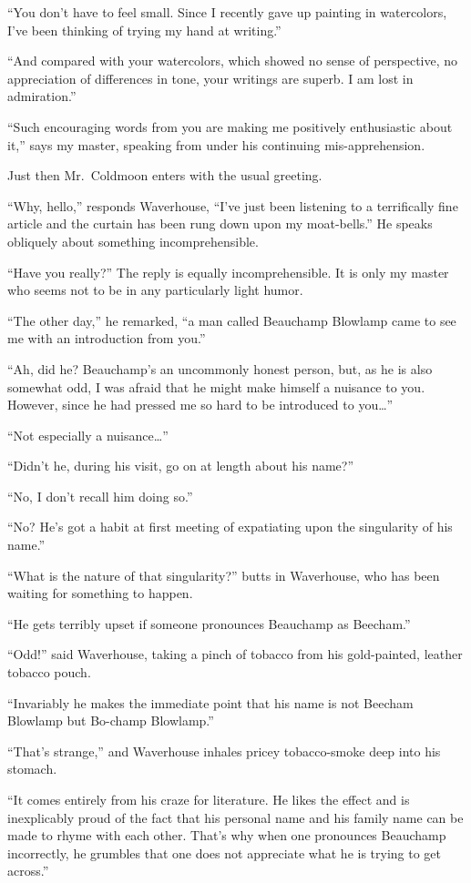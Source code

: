 \documentclass{book}
\begin{document}
``You don't have to feel small. Since I recently gave up painting in
watercolors, I've been thinking of trying my hand at writing.''

``And compared with your watercolors, which showed no sense of
perspective, no appreciation of differences in tone, your writings are
superb. I am lost in admiration.''

``Such encouraging words from you are making me positively enthusiastic
about it,'' says my master, speaking from under his continuing
mis-apprehension.

Just then Mr.~Coldmoon enters with the usual greeting.

``Why, hello,'' responds Waverhouse, ``I've just been listening to a
terrifically fine article and the curtain has been rung down upon my
moat-bells.'' He speaks obliquely about something incomprehensible.

``Have you really?'' The reply is equally incomprehensible. It is only
my master who seems not to be in any particularly light humor.

``The other day,'' he remarked, ``a man called Beauchamp Blowlamp came
to see me with an introduction from you.''

``Ah, did he? Beauchamp's an uncommonly honest person, but, as he is
also somewhat odd, I was afraid that he might make himself a nuisance to
you. However, since he had pressed me so hard to be introduced to
you\ldots{}''

``Not especially a nuisance\ldots{}''

``Didn't he, during his visit, go on at length about his name?''

``No, I don't recall him doing so.''

``No? He's got a habit at first meeting of expatiating upon the
singularity of his name.''

``What is the nature of that singularity?'' butts in Waverhouse, who has
been waiting for something to happen.

``He gets terribly upset if someone pronounces Beauchamp as Beecham.''

``Odd!'' said Waverhouse, taking a pinch of tobacco from his
gold-painted, leather tobacco pouch.

``Invariably he makes the immediate point that his name is not Beecham
Blowlamp but Bo-champ Blowlamp.''

``That's strange,'' and Waverhouse inhales pricey tobacco-smoke deep
into his stomach.

``It comes entirely from his craze for literature. He likes the effect
and is inexplicably proud of the fact that his personal name and his
family name can be made to rhyme with each other. That's why when one
pronounces Beauchamp incorrectly, he grumbles that one does not
appreciate what he is trying to get across.''
\end{document}

